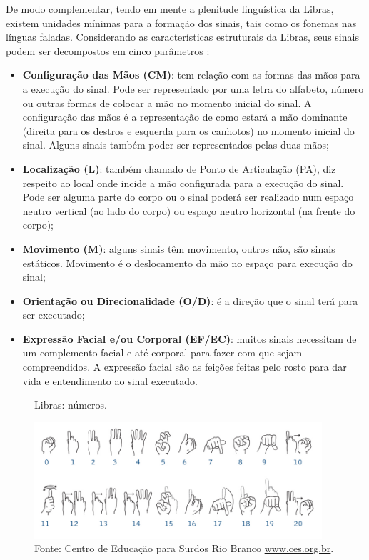 De modo complementar, tendo em mente a plenitude linguística da Libras, existem unidades mínimas para a formação dos sinais, tais como os fonemas nas línguas faladas. Considerando as características estruturais da Libras, seus sinais podem ser decompostos em cinco parâmetros \cite{Honora2017, Quadros2019}:

\begin{itemize}
    \item \textbf{Configuração das Mãos (CM)}: tem relação com as formas das mãos para a execução do sinal. Pode ser representado por uma letra do alfabeto, número ou outras formas de colocar a mão no momento inicial do sinal. A configuração das mãos é a representação de como estará a mão dominante (direita para os destros e esquerda para os canhotos) no momento inicial do sinal. Alguns sinais também poder ser representados pelas duas mãos;
    \item \textbf{Localização (L)}: também chamado de Ponto de Articulação (PA), diz respeito ao local onde incide a mão configurada para a execução do sinal. Pode ser alguma parte do corpo ou o sinal poderá ser realizado num espaço neutro vertical (ao lado do corpo) ou espaço neutro horizontal (na frente do corpo);
    \item \textbf{Movimento (M)}: alguns sinais têm movimento, outros não, são sinais estáticos. Movimento é o deslocamento da mão no espaço para execução do sinal;
    \item \textbf{Orientação ou Direcionalidade (O/D)}: é a direção que o sinal terá para ser executado;
    \item \textbf{Expressão Facial e/ou Corporal (EF/EC)}: muitos sinais necessitam de um complemento facial e até corporal para fazer com que sejam compreendidos. A expressão facial são as feições feitas pelo rosto para dar vida e entendimento ao sinal executado.
\end{itemize}

\begin{figure}[htbp]
\caption{Libras: números.}
\label{fig:libras-numeros}
\centerline{\includegraphics[width=0.95\textwidth]{images/libras-numeros.jpg}}
\caption*{Fonte: Centro de Educação para Surdos Rio Branco \url{www.ces.org.br}.}
\end{figure}

